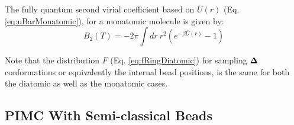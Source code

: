             The fully quantum second virial coefficient based on $\bar{U} (r)$ (Eq. \eqref{eq:uBarMonatomic}), for a monatomic molecule is given by:
            \begin{equation}
            \label{eq:b2Monatomic}
                B_2 (T) = -2 \pi \displaystyle\int dr~ r^2 (e^{-\beta \bar{U} (r)} - 1)
            \end{equation}

            Note that the distribution $F$ (Eq. \eqref{eq:fRingDiatomic}) for sampling ${\mathbf {\Delta}}$ conformations or equivalently the internal bead positions, is the same for both the diatomic as well as the monatomic cases.

    \subsection{PIMC With Semi-classical Beads}
    \label{chap:methods:subsec:PI SCB}

